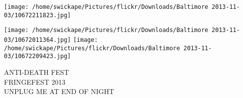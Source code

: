 \documentclass[10pt,letterpaper]{article}
\begin{document}
\texttt{[image: /home/swickape/Pictures/flickr/Downloads/Baltimore 2013-11-03/10672211823.jpg]}

\vspace{0.25in}
\texttt{[image: /home/swickape/Pictures/flickr/Downloads/Baltimore 2013-11-03/10672011364.jpg]}
\texttt{[image: /home/swickape/Pictures/flickr/Downloads/Baltimore 2013-11-03/10672209423.jpg]}

ANTI{-}DEATH FEST\\
FRINGEFEST 2013\\
UNPLUG ME AT END OF NIGHT
\pagebreak
\end{document}
